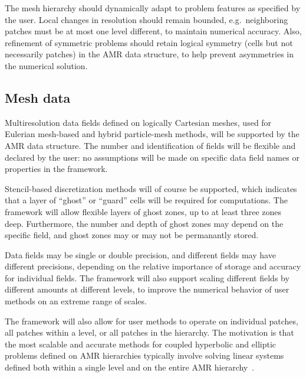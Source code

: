 \documentclass[10pt,twocolumn]{article}
\begin{document}
The mesh hierarchy should dynamically adapt to problem features as
specified by the user.  Local changes in resolution should remain
bounded, e.g.~neighboring patches must be at most one level different,
to maintain numerical accuracy.  Also, refinement of symmetric
problems should retain logical symmetry (cells but not necessarily
patches) in the AMR data structure, to help prevent asymmetries in the
numerical solution.


\subsection{Mesh data} \label{ss:require-fields}

Multiresolution data fields defined on logically Cartesian meshes,
used for Eulerian mesh-based and hybrid particle-mesh methods, will be
supported by the AMR data structure.  The number and identification of
fields will be flexible and declared by the user: no assumptions will
be made on specific data field names or properties in the framework.

Stencil-based discretization methods will of course be supported,
which indicates that a layer of ``ghost'' or ``guard'' cells will be
required for computations.  The framework will allow flexible layers
of ghost zones, up to at least three zones deep.  Furthermore, the
number and depth of ghost zones may depend on the specific field, and
ghost zones may or may not be permanantly stored.

Data fields may be single or double precision, and different fields
may have different precisions, depending on the relative importance of
storage and accuracy for individual fields.  The framework will also
support scaling different fields by different amounts at different
levels, to improve the numerical behavior of user methods on an
extreme range of scales.

The framework will also allow for user methods to operate on
individual patches, all patches within a level, or all patches in the
hierarchy.  The motivation is that the most scalable and accurate
methods for coupled hyperbolic and elliptic problems defined on AMR
hierarchies typically involve solving linear systems defined both
within a single level and on the entire AMR hierarchy~\cite{MiCo07}.


\end{document}
